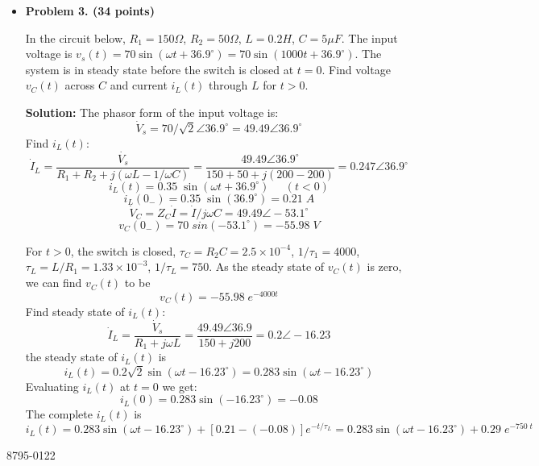\begin{itemize}
  {\bf Hint:} The two energy sources are at different frequencies. But
  you can still use superposition theorem to find $i(t)$.

 {\bf Solution:} Represent $v_0(t)$ and $i_0(t)$ as phasors:
 \[ \dot{V}_0=10\angle 0^\circ V,\;\;\;\;\; \dot{I}_0=2 \angle 45^\circ A \]
 Use superposition:
 \begin{itemize}
 \item Due to voltage source along with current source open,
 \[ \dot{I}'=\frac{\dot{V}_0}{j2/3+j2||(-j0.5)+5}
            =\frac{10\angle 0^\circ}{j2/3-j2/3+5}=2\angle 0^\circ \; A \]
 \[ i'(t)=2\sqrt{2} \cos 2t \; A \]
 \item Due to current source along with voltage source shorted, 
 \[ \dot{I}''=\dot{I}_0 \frac{j1+j3||(-j1/3)}{5+j1+j3||(-j1/3)}
    =2\angle 45^\circ \; \frac{j5/8}{5+j5/8}=0.25\angle 127.87^\circ \;A
 \]
 \[ i''(t)=0.25\sqrt{2} \cos(3t+127.87^\circ) \; A \]
 \end{itemize}
 The current $i(t)$ is therefore
 \[ i(t)=i'(t)+i''(t)=2\sqrt{2} \cos 2t+0.25\sqrt{2} \cos(3t+127.87^\circ) \; A \]


\item {\bf Problem 3. (34 points)} 

  In the circuit below, $R_1=150\Omega$, $R_2=50\Omega$, $L=0.2H$, $C=5\mu F$.
  The input voltage is $v_s(t)=70\sin(\omega t+36.9^\circ)=70\sin(1000 t+36.9^\circ)$.
  The system is in steady state before the switch is closed at $t=0$. Find voltage 
  $v_C(t)$ across $C$ and current $i_L(t)$ through $L$ for $t>0$.


  {\bf Solution:} 
  The phasor form of the input voltage is:
  \[ \dot{V}_s=70/\sqrt{2}\angle 36.9^\circ =49.49\angle 36.9^\circ \]
  Find $i_L(t)$:
  \[ \dot{I}_L=\frac{\dot{V_s}}{R_1+R_2+j(\omega L-1/\omega C)}
  =\frac{49.49\angle 36.9^\circ}{150+50+j(200-200)}=0.247\angle 36.9^\circ \]
  \[ i_L(t)=0.35\;\sin(\omega t+36.9^\circ)\;\;\;\;\;(t<0) \]
  \[ i_L(0_-)=0.35\;\sin(36.9^\circ)=0.21\;A \]
  \[ \dot{V}_C=Z_C \dot{I}=\dot{I}/j\omega C =49.49\angle -53.1^\circ \]
  \[ v_C(0_-)=70\;sin(-53.1^\circ)=-55.98\;V \]

  For $t>0$, the switch is closed, $\tau_C=R_2C=2.5\times 10^{-4}$, 
  $1/\tau_1=4000$, $\tau_L=L/R_1=1.33\times 10^{-3}$, $1/\tau_L=750$.
  As the steady state of $v_C(t)$ is zero, we can find $v_C(t)$ to be
  \[ v_C(t)=-55.98\;e^{-4000  t} \]
  Find steady state of $i_L(t)$:
  \[ \dot{I}_L=\frac{\dot{V}_s}{R_1+j\omega L}=\frac{49.49\angle 36.9}{150+j200}
  =0.2\angle -16.23 \]
  the steady state of $i_L(t)$ is
  \[ i_L(t)=0.2\sqrt{2}\sin(\omega t-16.23^\circ)=0.283\sin(\omega t-16.23^\circ) \]
  Evaluating $i_L(t)$ at $t=0$ we get:
  \[ i_L(0)=0.283\sin(-16.23^\circ)=-0.08 \]
  The complete $i_L(t)$ is
  \[ i_L(t)=0.283\sin(\omega t-16.23^\circ)+[0.21-(-0.08)]e^{-t/\tau_L}
  =0.283\sin(\omega t-16.23^\circ)+0.29\;e^{-750\;t} \]

\end{itemize}



8795-0122

